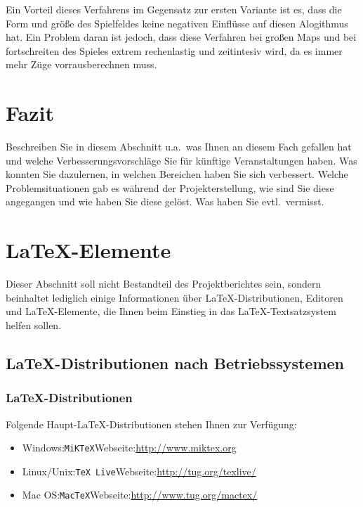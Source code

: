 \documentclass[12pt,a4paper,bibliography=totocnumbered,listof=totocnumbered]{article}
\begin{document}
Ein Vorteil dieses Verfahrens im Gegensatz zur ersten Variante ist es, dass die Form und größe des Spielfeldes keine negativen Einflüsse auf diesen Alogithmus hat. Ein Problem daran ist jedoch, dass diese Verfahren bei großen Maps und bei fortschreiten des Spieles extrem rechenlastig und zeitintesiv wird, da es immer mehr Züge vorrausberechnen muss.

\newpage
\section{Fazit}
Beschreiben Sie in diesem Abschnitt u.a.\ was Ihnen an diesem Fach gefallen hat und welche Verbesserungsvorschläge Sie für künftige Veranstaltungen haben. Was konnten Sie dazulernen, in welchen Bereichen haben Sie sich verbessert. Welche Problemsituationen gab es während der Projekterstellung, wie sind Sie diese angegangen und wie haben Sie diese gelöst. Was haben Sie evtl.\ vermisst.


\newpage
\section{\LaTeX-Elemente}
Dieser Abschnitt soll nicht Bestandteil des Projektberichtes sein, sondern beinhaltet lediglich einige Informationen über \LaTeX-Distributionen, Editoren und \LaTeX-Elemente, die Ihnen beim Einstieg in das \LaTeX-Textsatzsystem helfen sollen.

\subsection{\LaTeX-Distributionen nach Betriebssystemen}

\subsubsection{\LaTeX-Distributionen}
Folgende Haupt-\LaTeX-Distributionen stehen Ihnen zur Verfügung:
\begin{itemize}
  \item Windows:\quad \texttt{MiKTeX}\quad Webseite:\quad\url{http://www.miktex.org}
  \item Linux/Unix:\quad \texttt{TeX Live}\quad Webseite:\quad\url{http://tug.org/texlive/}
  \item Mac OS:\quad \texttt{MacTeX}\quad Webseite:\quad\url{http://www.tug.org/mactex/}
\end{itemize}
\end{document}

